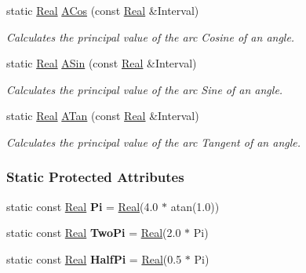 \begin{DoxyCompactItemize}
static \hyperlink{namespacephys_af7eb897198d265b8e868f45240230d5f}{Real} \hyperlink{classphys_1_1MathTool_a42fe1e0bd7b1472567b126da4b512a5d}{ACos} (const \hyperlink{namespacephys_af7eb897198d265b8e868f45240230d5f}{Real} \&Interval)
\begin{DoxyCompactList}\small\item\em Calculates the principal value of the arc Cosine of an angle. \item\end{DoxyCompactList}\item 
static \hyperlink{namespacephys_af7eb897198d265b8e868f45240230d5f}{Real} \hyperlink{classphys_1_1MathTool_a89e9613eea236a9729a08500c47283d3}{ASin} (const \hyperlink{namespacephys_af7eb897198d265b8e868f45240230d5f}{Real} \&Interval)
\begin{DoxyCompactList}\small\item\em Calculates the principal value of the arc Sine of an angle. \item\end{DoxyCompactList}\item 
static \hyperlink{namespacephys_af7eb897198d265b8e868f45240230d5f}{Real} \hyperlink{classphys_1_1MathTool_ac421007a0a5c5e0b29b832f841327cb0}{ATan} (const \hyperlink{namespacephys_af7eb897198d265b8e868f45240230d5f}{Real} \&Interval)
\begin{DoxyCompactList}\small\item\em Calculates the principal value of the arc Tangent of an angle. \item\end{DoxyCompactList}\end{DoxyCompactItemize}
\subsubsection*{Static Protected Attributes}
\begin{DoxyCompactItemize}
\item 
\hypertarget{classphys_1_1MathTool_ac887c964924c64cc3fa821ffa487761f}{
static const \hyperlink{namespacephys_af7eb897198d265b8e868f45240230d5f}{Real} {\bfseries Pi} = \hyperlink{namespacephys_af7eb897198d265b8e868f45240230d5f}{Real}(4.0 $\ast$ atan(1.0))}
\label{d6/df1/classphys_1_1MathTool_ac887c964924c64cc3fa821ffa487761f}

\item 
\hypertarget{classphys_1_1MathTool_a85392fa7027d7e4e236b06a78f53ab98}{
static const \hyperlink{namespacephys_af7eb897198d265b8e868f45240230d5f}{Real} {\bfseries TwoPi} = \hyperlink{namespacephys_af7eb897198d265b8e868f45240230d5f}{Real}(2.0 $\ast$ Pi)}
\label{d6/df1/classphys_1_1MathTool_a85392fa7027d7e4e236b06a78f53ab98}

\item 
\hypertarget{classphys_1_1MathTool_ae06c08968247612787b7c0b9fbd89c04}{
static const \hyperlink{namespacephys_af7eb897198d265b8e868f45240230d5f}{Real} {\bfseries HalfPi} = \hyperlink{namespacephys_af7eb897198d265b8e868f45240230d5f}{Real}(0.5 $\ast$ Pi)}
\label{d6/df1/classphys_1_1MathTool_ae06c08968247612787b7c0b9fbd89c04}

\end{DoxyCompactItemize}


